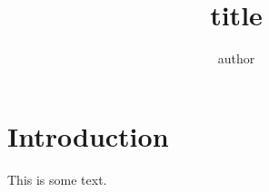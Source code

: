    \title{title}
   \author{author}

   \maketitle   
   \section{Introduction}
   This is some text.

